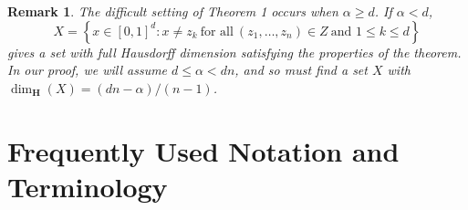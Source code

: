 \documentclass[usenames,dvipsnames]{article}
\theoremstyle{plain}
\theoremstyle{plain}
\newtheorem*{remark}{Remark}
\begin{document}
\begin{remark}
	The difficult setting of Theorem 1 occurs when $\alpha \geq d$. If $\alpha < d$,
	\[ X = \left\{ x \in [0,1]^d : x \neq z_k\ \text{for all}\ (z_1, \dots, z_n) \in Z\ \text{and $1 \leq k \leq d$} \right\} \]
	gives a set with full Hausdorff dimension satisfying the properties of the theorem. In our proof, we will assume $d \leq \alpha < dn$, and so must find a set $X$ with $\dim_{\mathbf{H}}(X) = (dn - \alpha) / (n-1)$.
\end{remark}









\section{Frequently Used Notation and Terminology}
\end{document}
